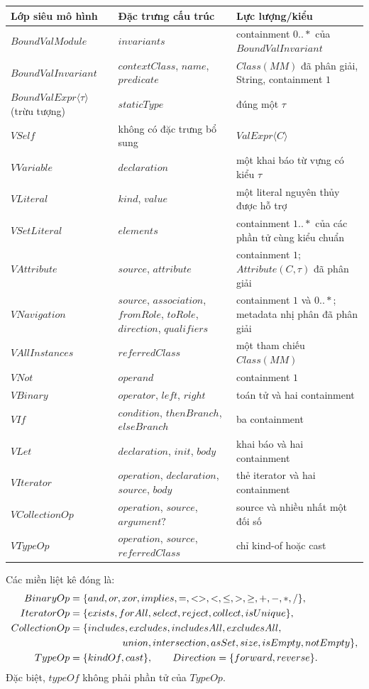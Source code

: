 \documentclass[11pt,a4paper]{article}
\theoremstyle{definition}
\begin{document}
\begingroup\small
\begin{longtable}{p{}p{}p{}}
\toprule
Lớp siêu mô hình & Đặc trưng cấu trúc & Lực lượng/kiểu\\
\midrule
$BoundValModule$ & $invariants$ & containment $0..*$ của $BoundValInvariant$\\
$BoundValInvariant$ & $contextClass$, $name$, $predicate$ & $Class(MM)$ đã phân giải, String, containment $1$\\
$BoundValExpr\langle\tau\rangle$ (trừu tượng) & $staticType$ & đúng một $\tau$\\
$VSelf$ & không có đặc trưng bổ sung & $ValExpr\langle C\rangle$\\
$VVariable$ & $declaration$ & một khai báo từ vựng có kiểu $\tau$\\
$VLiteral$ & $kind$, $value$ & một literal nguyên thủy được hỗ trợ\\
$VSetLiteral$ & $elements$ & containment $1..*$ của các phần tử cùng kiểu chuẩn\\
$VAttribute$ & $source$, $attribute$ & containment $1$; $Attribute(C,\tau)$ đã phân giải\\
$VNavigation$ & $source$, $association$, $fromRole$, $toRole$, $direction$, $qualifiers$ & containment $1$ và $0..*$; metadata nhị phân đã phân giải\\
$VAllInstances$ & $referredClass$ & một tham chiếu $Class(MM)$\\
$VNot$ & $operand$ & containment $1$\\
$VBinary$ & $operator$, $left$, $right$ & toán tử và hai containment\\
$VIf$ & $condition$, $thenBranch$, $elseBranch$ & ba containment\\
$VLet$ & $declaration$, $init$, $body$ & khai báo và hai containment\\
$VIterator$ & $operation$, $declaration$, $source$, $body$ & thẻ iterator và hai containment\\
$VCollectionOp$ & $operation$, $source$, $argument?$ & source và nhiều nhất một đối số\\
$VTypeOp$ & $operation$, $source$, $referredClass$ & chỉ kind-of hoặc cast\\
\bottomrule
\end{longtable}
\endgroup

Các miền liệt kê đóng là:
\[
\begin{split}
BinaryOp={}&\{and,or,xor,implies,=,<>,<,\leq,>,\geq,+,-,*,/\},\\
IteratorOp={}&\{exists,forAll,select,reject,collect,isUnique\},\\
CollectionOp={}&\{includes,excludes,includesAll,excludesAll,\\
&\hspace{1.4cm}union,intersection,asSet,size,isEmpty,notEmpty\},\\
TypeOp={}&\{kindOf,cast\},\qquad Direction=\{forward,reverse\}.
\end{split}
\]
Đặc biệt, $typeOf$ không phải phần tử của $TypeOp$.
\end{document}
